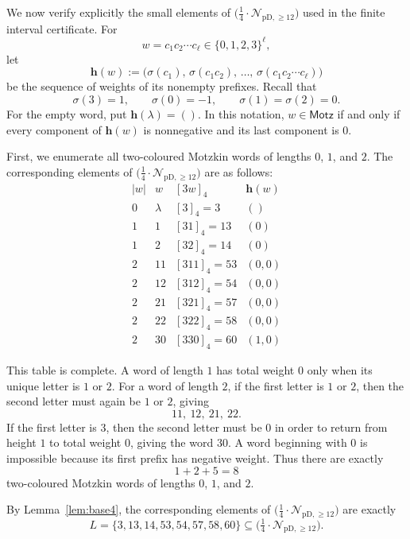 \documentclass[12pt]{article}
\theoremstyle{plain}
\theoremstyle{definition}
\theoremstyle{plain}
\newcommand{\Pset}{%
  \bigl(\tfrac{1}{4}\cdot\mathcal{N}_{\mathrm{pD},\geq 12}\bigr)%
}
\begin{document}
We now verify explicitly the small elements of $\Pset$ used in the finite
interval certificate.  For
\[
 w=c_1c_2\cdots c_\ell\in\{0,1,2,3\}^{\ell},
\]
let
\[
 \mathbf h(w):=
 \bigl(
 \sigma(c_1),\,
 \sigma(c_1c_2),\,
 \ldots,\,
 \sigma(c_1c_2\cdots c_\ell)
 \bigr)
\]
be the sequence of weights of its nonempty prefixes.  Recall that
\[
 \sigma(3)=1,\qquad
 \sigma(0)=-1,\qquad
 \sigma(1)=\sigma(2)=0.
\]
For the empty word, put $\mathbf h(\lambda)=()$.  In this notation,
$w\in\mathsf{Motz}$ if and only if every component of $\mathbf h(w)$ is
nonnegative and its last component is $0$.

First, we enumerate all two-coloured Motzkin words of lengths $0$, $1$,
and $2$.  The corresponding elements of $\Pset$ are as follows:
\[
\begin{array}{c|c|c|c}
 |w|&w&[3w]_4&\mathbf h(w)\\ \hline
0&\lambda &[3]_4=3&()\\ \hline
1&1 &[31]_4=13&(0)\\
1&2 &[32]_4=14&(0)\\ \hline
2&11 &[311]_4=53&(0,0)\\
2&12 &[312]_4=54&(0,0)\\
2&21 &[321]_4=57&(0,0)\\
2&22 &[322]_4=58&(0,0)\\
2&30 &[330]_4=60&(1,0)
\end{array}
\]

This table is complete.  A word of length $1$ has total weight $0$ only
when its unique letter is $1$ or $2$.  For a word of length $2$, if the
first letter is $1$ or $2$, then the second letter must again be $1$ or
$2$, giving
\[
 11,\ 12,\ 21,\ 22.
\]
If the first letter is $3$, then the second letter must be $0$ in order
to return from height $1$ to total weight $0$, giving the word $30$.
A word beginning with $0$ is impossible because its first prefix has
negative weight.  Thus there are exactly
\[
 1+2+5=8
\]
two-coloured Motzkin words of lengths $0$, $1$, and $2$.

By Lemma~\ref{lem:base4}, the corresponding elements of $\Pset$ are
exactly
\begin{equation}\label{eq:L-def}
 L=\{3,13,14,53,54,57,58,60\}
 \subseteq\Pset.
\end{equation}
\end{document}
